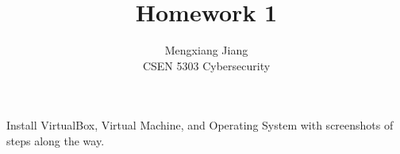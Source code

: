 \documentclass[12pt]{article}
\newenvironment{problem}[2][Problem]{\begin{trivlist}
\item[\hskip \labelsep {\bfseries #1}\hskip \labelsep {\bfseries #2.}]}{\end{trivlist}}
\begin{document}
 
 
\title{Homework 1}%
\author{Mengxiang Jiang\\ %
CSEN 5303 Cybersecurity} %
 
\maketitle
 
\begin{problem}{1} %
Install VirtualBox, Virtual Machine, and Operating System with screenshots of steps along the way.


\end{problem}
\end{document}
